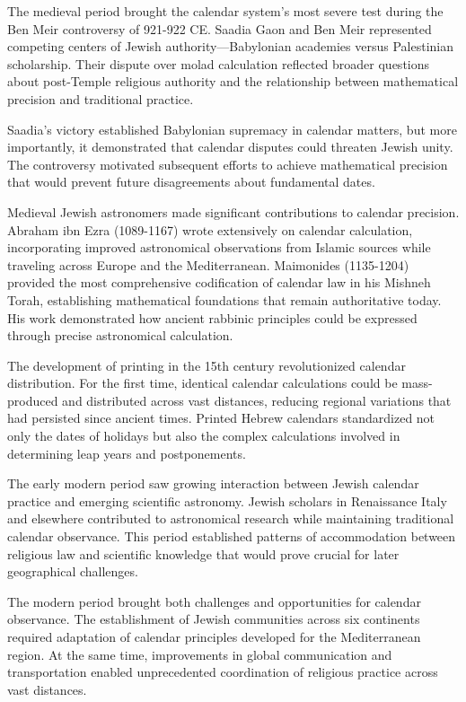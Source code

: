 \begin{historical}
The medieval period brought the calendar system's most severe test during the Ben Meir controversy of 921-922 CE. Saadia Gaon and Ben Meir represented competing centers of Jewish authority—Babylonian academies versus Palestinian scholarship. Their dispute over molad calculation reflected broader questions about post-Temple religious authority and the relationship between mathematical precision and traditional practice.

Saadia's victory established Babylonian supremacy in calendar matters, but more importantly, it demonstrated that calendar disputes could threaten Jewish unity. The controversy motivated subsequent efforts to achieve mathematical precision that would prevent future disagreements about fundamental dates.

Medieval Jewish astronomers made significant contributions to calendar precision. Abraham ibn Ezra (1089-1167) wrote extensively on calendar calculation, incorporating improved astronomical observations from Islamic sources while traveling across Europe and the Mediterranean. Maimonides (1135-1204) provided the most comprehensive codification of calendar law in his Mishneh Torah, establishing mathematical foundations that remain authoritative today. His work demonstrated how ancient rabbinic principles could be expressed through precise astronomical calculation.

The development of printing in the 15th century revolutionized calendar distribution. For the first time, identical calendar calculations could be mass-produced and distributed across vast distances, reducing regional variations that had persisted since ancient times. Printed Hebrew calendars standardized not only the dates of holidays but also the complex calculations involved in determining leap years and postponements.

The early modern period saw growing interaction between Jewish calendar practice and emerging scientific astronomy. Jewish scholars in Renaissance Italy and elsewhere contributed to astronomical research while maintaining traditional calendar observance. This period established patterns of accommodation between religious law and scientific knowledge that would prove crucial for later geographical challenges.

The modern period brought both challenges and opportunities for calendar observance. The establishment of Jewish communities across six continents required adaptation of calendar principles developed for the Mediterranean region. At the same time, improvements in global communication and transportation enabled unprecedented coordination of religious practice across vast distances.


\end{historical}
